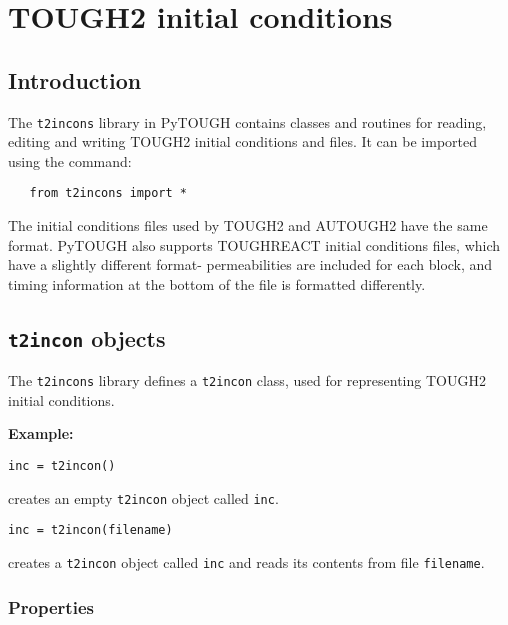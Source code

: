 \chapter{TOUGH2 initial conditions}
\label{incons}

\section{Introduction}
The \texttt{t2incons} library in PyTOUGH contains classes and routines for reading, editing and writing TOUGH2 initial conditions and files.  It can be imported using the command:

\begin{lstlisting}
   from t2incons import *
\end{lstlisting}

The initial conditions files used by TOUGH2 and AUTOUGH2 have the same format.  PyTOUGH also supports TOUGHREACT initial conditions files, which have a slightly different format- permeabilities are included for each block, and timing information at the bottom of the file is formatted differently.

\section{\texttt{t2incon} objects}

The \texttt{t2incons} library defines a \texttt{t2incon} class, used for representing TOUGH2 initial conditions.

\textbf{Example:}

\begin{lstlisting}
inc = t2incon()
\end{lstlisting}

creates an empty \texttt{t2incon} object called \texttt{inc}.

\begin{lstlisting}
inc = t2incon(filename)
\end{lstlisting}

creates a \texttt{t2incon} object called \texttt{inc} and reads its contents from file \texttt{filename}.

\subsection{Properties}

